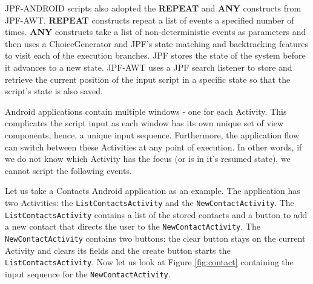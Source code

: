 \documentclass{acm_proc_article-sp}
\begin{document}
JPF-ANDROID scripts also adopted the \textbf{REPEAT} and \textbf{ANY} constructs from JPF-AWT. \textbf{REPEAT} constructs repeat a list of
events a specified number of times. \textbf{ANY} constructs take a list of non-deterministic events as parameters and then uses a ChoiceGenerator and JPF's
state matching and backtracking features to visit each of the execution branches. JPF stores the state of the system before it advances
to a new state. JPF-AWT uses a JPF search listener to store and retrieve the current position of the input script in a specific state so
that the script's state is also saved.

Android applications contain multiple windows - one for each Activity. This complicates the script input as each window has its own unique
set of view components, hence, a unique input sequence. Furthermore, the application flow can switch between these Activities
at any point of execution. In other words, if we do not know which Activity has the focus (or is in it's resumed state), we cannot script
the following events.

Let us take a Contacts Android application as an example. The application has two Activities: the \texttt{ListContactsActivity} and the
\texttt{NewContactActivity}. The \texttt{ListContactsActivity} contains a list of the stored contacts and a button to add a new contact that directs the
user to the \texttt{NewContactActivity}. The \texttt{NewContactActivity} contains two buttons: the clear button stays on the current Activity and clears its
fields and the create button starts the \texttt{ListContactsActivity}. Now let us look at Figure \ref{fig:contact} containing the input
sequence for the \texttt{NewContactActivity}.
\end{document}

